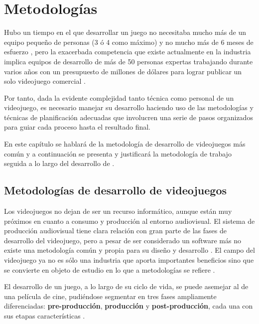 \chapter{Metodologías}
\label{chap:metodologias}

Hubo un tiempo en el que desarrollar un juego no necesitaba mucho más de un equipo pequeño de personas (3 ó 4 como máximo) y no mucho más de 6 meses de esfuerzo \cite{dill-07}, pero la exacerbada competencia que existe actualmente en la industria implica equipos de desarrollo de más de 50 personas expertas trabajando durante varios años con un presupuesto de millones de dólares para lograr publicar un solo videojuego comercial \cite{mor-10}. 

Por tanto, dada la evidente complejidad tanto técnica como personal de un videojuego, es necesario manejar su desarrollo haciendo uso de las metodologías y técnicas de planificación adecuadas que involucren una serie de pasos organizados para guiar cada proceso hasta el resultado final.

En este capítulo se hablará de la metodología de desarrollo de videojuegos más común y a continuación se presenta y justificará la metodología de trabajo seguida a lo largo del desarrollo de \MineRVa.

\section{Metodologías de desarrollo de videojuegos}

Los videojuegos no dejan de ser un recurso informático, aunque están muy próximos en cuanto a consumo y producción al entorno audiovisual. El sistema de producción audiovisual tiene clara relación con gran parte de las fases de desarrollo del videojuego, pero a pesar de ser considerado un software más no existe una metodología común y propia para su diseño y desarrollo \cite{man-14}. El campo del videojuego ya no es sólo una industria que aporta importantes beneficios sino que se convierte en objeto de estudio en lo que a metodologías se refiere \cite{agu-08}.

El desarrollo de un juego, a lo largo de su ciclo de vida, se puede asemejar al de una película de cine, pudiéndose segmentar en tres fases ampliamente diferenciadas: \textbf{pre-producción}, \textbf{producción} y \textbf{post-producción}, cada una con sus etapas características \cite{bet-03}.

\vspace{0.4cm}

